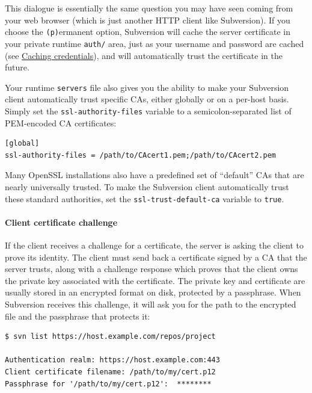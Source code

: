 This dialogue is essentially the same question you may have seen coming
from your web browser (which is just another HTTP client like
Subversion). If you choose the \texttt{(p)}ermanent option, Subversion
will cache the server certificate in your private runtime \texttt{auth/}
area, just as your username and password are cached (see
\hyperref[svn.serverconfig.netmodel.credcache]{Caching credentials}),
and will automatically trust the certificate in the future.

Your runtime \texttt{servers} file also gives you the ability to make
your Subversion client automatically trust specific CAs, either globally
or on a per-host basis. Simply set the \texttt{ssl-authority-files}
variable to a semicolon-separated list of PEM-encoded CA certificates:

\begin{verbatim}
[global]
ssl-authority-files = /path/to/CAcert1.pem;/path/to/CAcert2.pem
\end{verbatim}

Many OpenSSL installations also have a predefined set of ``default'' CAs
that are nearly universally trusted. To make the Subversion client
automatically trust these standard authorities, set the
\texttt{ssl-trust-default-ca} variable to \texttt{true}.

\paragraph{Client certificate
challenge}\label{svn.serverconfig.httpd.ssl.client.clientcert}

If the client receives a challenge for a certificate, the server is
asking the client to prove its identity. The client must send back a
certificate signed by a CA that the server trusts, along with a
challenge response which proves that the client owns the private key
associated with the certificate. The private key and certificate are
usually stored in an encrypted format on disk, protected by a
passphrase. When Subversion receives this challenge, it will ask you for
the path to the encrypted file and the passphrase that protects it:

\begin{verbatim}
$ svn list https://host.example.com/repos/project

Authentication realm: https://host.example.com:443
Client certificate filename: /path/to/my/cert.p12
Passphrase for '/path/to/my/cert.p12':  ********
\end{verbatim}

